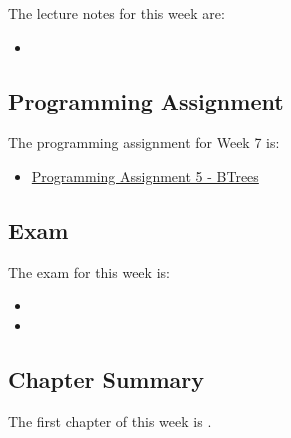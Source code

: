 The lecture notes for this week are:

\begin{itemize}
    \item {}
\end{itemize}

\subsection{Programming Assignment}

The programming assignment for Week 7 is:

\begin{itemize}
    \item \href{https://github.com/QuantumCompiler/CU/tree/main/CSPB%202270%20-%20Data%20Structures/CSPB%202270%20-%20Programming%20Assignments/CSPB%202270%20-%20Assignment%205%20-%20B-Trees}{Programming Assignment 5 - BTrees}
\end{itemize}

\subsection{Exam}

The exam for this week is:

\begin{itemize}
    \item {}
    \item {}
\end{itemize}

\subsection{Chapter Summary}

The first chapter of this week is .

